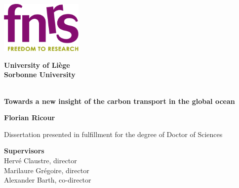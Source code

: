 \documentclass[a4paper]{report}
\begin{document}
\begin{titlepage}
    \begin{center}
        \includegraphics[width=0.3\textwidth]{FRS-FNR_S2-PANT_UK_CS.png} %
        \vspace{1cm}
        
        \LARGE \textbf{University of Liège}\\
        \LARGE \textbf{Sorbonne University}\\
        
        \vspace{1.5cm}
        
        \hrulefill \\
        \vspace{0.5cm}
        {\huge \textbf{Towards a new insight of the carbon transport in the global ocean}} \\
        \hrulefill
        
        \vspace{1.5cm}
        {\Large \textbf{Florian Ricour}}

        \vspace{1cm}

        Dissertation presented in fulfillment for the degree of Doctor of Sciences
        
        \vfill

        \begin{flushleft}
            \large
            \textbf{Supervisors}\\
            \vspace{0.1cm}
            Hervé Claustre, director\\
            Marilaure Grégoire, director\\
            Alexander Barth, co-director\\
        \end{flushleft}
        

\end{center}
\end{titlepage}
\end{document}

